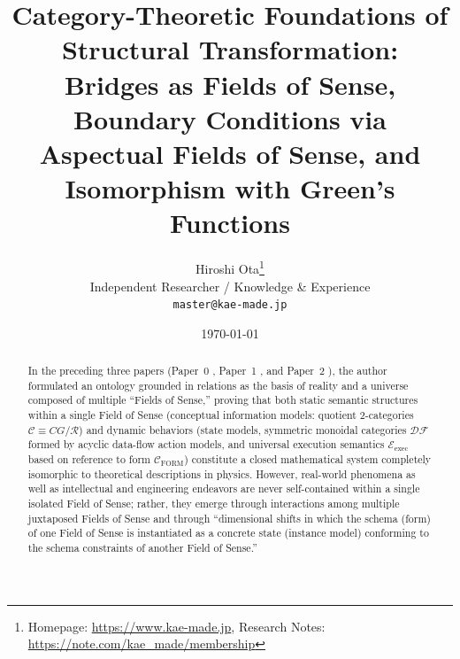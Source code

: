 \documentclass[11pt,a4paper]{article}
\title{\textbf{Category-Theoretic Foundations of Structural Transformation:\\
Bridges as Fields of Sense, Boundary Conditions via Aspectual Fields of Sense, and Isomorphism with Green's Functions}}
\author{Hiroshi Ota\thanks{Homepage: \url{https://www.kae-made.jp}, Research Notes: \url{https://note.com/kae_made/membership}}\\
\small Independent Researcher / Knowledge \& Experience\\
\small \texttt{master@kae-made.jp}}
\date{\today}
\theoremstyle{definition}
\theoremstyle{plain}
\theoremstyle{remark}
\newcommand{\CFORM}{\mathcal{C}_{\mathrm{FORM}}}
\newcommand{\Eexec}{\mathcal{E}_{\mathrm{exec}}}
\begin{document}
\maketitle

\begin{abstract}
In the preceding three papers (Paper~0 \cite{ota2026paper0}, Paper~1 \cite{ota2026paper1}, and Paper~2 \cite{ota2026paper2}), the author formulated an ontology grounded in relations as the basis of reality and a universe composed of multiple ``Fields of Sense,'' proving that both static semantic structures within a single Field of Sense (conceptual information models: quotient 2-categories $\mathcal{C} \equiv CG/\mathcal{R}$) and dynamic behaviors (state models, symmetric monoidal categories $\mathcal{DF}$ formed by acyclic data-flow action models, and universal execution semantics $\Eexec$ based on reference to form $\CFORM$) constitute a closed mathematical system completely isomorphic to theoretical descriptions in physics. However, real-world phenomena as well as intellectual and engineering endeavors are never self-contained within a single isolated Field of Sense; rather, they emerge through interactions among multiple juxtaposed Fields of Sense and through ``dimensional shifts in which the schema (form) of one Field of Sense is instantiated as a concrete state (instance model) conforming to the schema constraints of another Field of Sense.''


\end{abstract}
\end{document}
